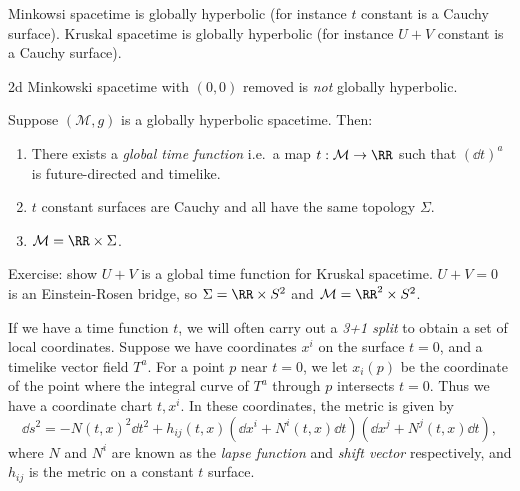 \documentclass{jknotes}
\begin{document}
\begin{eg}
    Minkowsi spacetime is globally hyperbolic (for instance \(t\) constant is a Cauchy surface). Kruskal spacetime is globally hyperbolic (for instance \(U+V\) constant is a Cauchy surface).

    2d Minkowski spacetime with \((0,0)\) removed is \emph{not} globally hyperbolic.
\end{eg}

\begin{theorem}
    Suppose \((\mathcal{M},g)\) is a globally hyperbolic spacetime. Then:
    \begin{enumerate}
        \item There exists a \emph{global time function} i.e.\ a map \(t:\mathcal{M}\to\RR\) such that \((\dd{t})^a\) is future-directed and timelike.
        \item \(t\) constant surfaces are Cauchy and all have the same topology \(\Sigma\).
        \item \(\mathcal{M} = \RR\times\Sigma\).
    \end{enumerate}
\end{theorem}

Exercise: show \(U+V\) is a global time function for Kruskal spacetime. \(U+V = 0\) is an Einstein-Rosen bridge, so \(\Sigma = \RR \times S^2\) and \(\mathcal{M} = \RR^2\times S^2\).


\begin{wrapfigure}{r}{0.4\linewidth}
    \centering
\end{wrapfigure}
If we have a time function \(t\), we will often carry out a \emph{3+1 split} to obtain a set of local coordinates. Suppose we have coordinates \(x^i\) on the surface \(t=0\), and a timelike vector field \(T^a\).
For a point \(p\) near \(t=0\), we let \(x_i(p)\) be the coordinate of the point where the integral curve of \(T^a\) through \(p\) intersects \(t=0\). Thus we have a coordinate chart \(t,x^i\). In these coordinates, the metric is given by
\begin{equation}
    \dd{s}^2 = -N(t,x)^2\dd{t}^2 + h_{ij}(t,x)(\dd{x^i} + N^i(t,x)\dd{t})(\dd{x^j} + N^j(t,x)\dd{t}),
\end{equation}
where \(N\) and \(N^i\) are known as the \emph{lapse function} and \emph{shift vector} respectively, and \(h_{ij}\) is the metric on a constant \(t\) surface.
\end{document}
